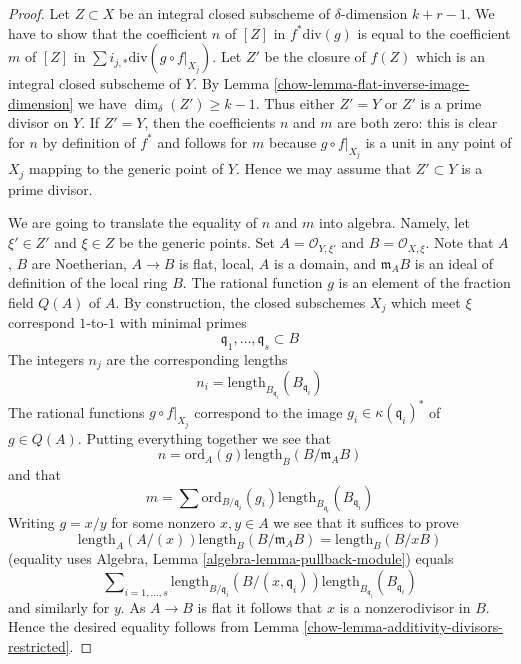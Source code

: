 \begin{proof}

Let $Z \subset X$ be an integral closed subscheme of $\delta$-dimension
$k + r - 1$. We have to show that the coefficient $n$ of $[Z]$ in
$f^*\text{div}(g)$ is equal to the coefficient
$m$ of $[Z]$ in $\sum i_{j, *} \text{div}(g \circ f|_{X_j})$.
Let $Z'$ be the closure of $f(Z)$ which is an integral closed
subscheme of $Y$. By Lemma \ref{chow-lemma-flat-inverse-image-dimension}
we have $\dim_\delta(Z') \geq k - 1$. Thus either $Z' = Y$
or $Z'$ is a prime divisor on $Y$. If $Z' = Y$, then the coefficients
$n$ and $m$ are both zero: this is clear for $n$ by definition
of $f^*$ and follows for $m$ because $g \circ f|_{X_j}$ is
a unit in any point of $X_j$ mapping to the generic point of $Y$.
Hence we may assume that $Z' \subset Y$ is a prime divisor.

\medskip\noindent
We are going to translate the equality of $n$ and $m$ into algebra.
Namely, let $\xi' \in Z'$ and $\xi \in Z$ be the generic points.
Set $A = \mathcal{O}_{Y, \xi'}$ and $B = \mathcal{O}_{X, \xi}$.
Note that $A$, $B$ are Noetherian, $A \to B$ is flat, local,
$A$ is a domain, and $\mathfrak m_AB$ is an ideal of definition
of the local ring $B$. The rational function $g$ is an element
of the fraction field $Q(A)$ of $A$.
By construction, the closed subschemes $X_j$
which meet $\xi$ correspond $1$-to-$1$ with minimal primes
$$
\mathfrak q_1, \ldots, \mathfrak q_s \subset B
$$
The integers $n_j$ are the corresponding lengths
$$
n_i = \text{length}_{B_{\mathfrak q_i}}(B_{\mathfrak q_i})
$$
The rational functions $g \circ f|_{X_j}$ correspond to the image
$g_i \in \kappa(\mathfrak q_i)^*$ of $g \in Q(A)$.
Putting everything together we see that
$$
n = \text{ord}_A(g) \text{length}_B(B/\mathfrak m_AB)
$$
and that
$$
m = \sum \text{ord}_{B/\mathfrak q_i}(g_i)
\text{length}_{B_{\mathfrak q_i}}(B_{\mathfrak q_i})
$$
Writing $g = x/y$ for some nonzero $x, y \in A$ we see that it suffices
to prove
$$
\text{length}_A(A/(x)) \text{length}_B(B/\mathfrak m_AB) =
\text{length}_B(B/xB)
$$
(equality uses Algebra, Lemma \ref{algebra-lemma-pullback-module})
equals
$$
\sum\nolimits_{i = 1, \ldots, s}
\text{length}_{B/\mathfrak q_i}(B/(x, \mathfrak q_i))
\text{length}_{B_{\mathfrak q_i}}(B_{\mathfrak q_i})
$$
and similarly for $y$. As $A \to B$ is flat it follows that $x$
is a nonzerodivisor in $B$. Hence the desired equality follows from
Lemma \ref{chow-lemma-additivity-divisors-restricted}.
\end{proof}

